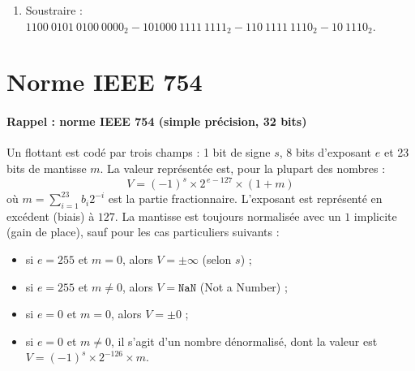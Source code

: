 \documentclass[a4paper,11pt]{article}
\newif\ifsolutions
\begin{document}
\begin{enumerate}
    \item Soustraire : $1100\ 0101\ 0100\ 0000_2 - 101000\ 1111\ 1111_2 - 110\ 1111\ 1110_2 - 10\ 1110_2$.
    \ifsolutions
    \begin{solbox}
    \textit{Piège classique :} Si on ne tient pas compte du format et qu'on complémente ``mal'' (sans aligner les tailles), on obtient un résultat faux. Il faut ramener tous les opérandes à la même taille (ici, 16 bits minimum, mais 17 bits pour être sûr avec des signés).

    Valeurs décimales (pour vérification) : $50496 - 10495 - 1790 - 46 = 38165$.

    En se ramenant à une représentation \textbf{signée sur 17 bits} (pour gérer correctement le bit de signe de l'opérande positif initial de 16 bits) :
    \begin{lstlisting}
       0 1100 0101 0100 0000  (+50496)
     + 1 1101 0111 0000 0001  (-10495 en C2 sur 17 bits)
     + 1 1111 1001 0000 0010  (-1790 en C2 sur 17 bits)
     + 1 1111 1111 1101 0010  (-46 en C2 sur 17 bits)
     -----------------------
     1 0 1001 0101 0001 0101
    \end{lstlisting}
    La retenue de 18ème bit est ignorée. Le résultat sur 17 bits est $0\ 1001\ 0101\ 0001\ 0101_2$, qui vaut bien $\mathbf{38165_{10}}$.

    \textbf{Règle générale :} Pour additionner/soustraire des nombres signés, il faut les coder sur $n$ bits, où :
    $$ n = 1 + \max \Big( \lfloor \log_2(|x_1|) \rfloor + 1,\ \dots,\ \lfloor \log_2(|x_m|) \rfloor + 1 \Big) $$
    Ici, $n = 1 + \max(16, 14, 11, 6) = 17$ bits.
    \end{solbox}
    \fi
\end{enumerate}

\section{Norme IEEE 754}
\paragraph{Rappel : norme IEEE 754 (simple précision, 32 bits)}
Un flottant est codé par trois champs : 1 bit de signe $s$, 8 bits d'exposant $e$ et 23 bits de mantisse $m$.
La valeur représentée est, pour la plupart des nombres :
\[
V = (-1)^s \times 2^{\,e-127} \times (1 + m)
\]
où $m = \sum_{i=1}^{23} b_i 2^{-i}$ est la partie fractionnaire. L'exposant est représenté en excédent (biais) à $127$. La mantisse est toujours normalisée avec un $1$ implicite (gain de place), sauf pour les cas particuliers suivants :
\begin{itemize}
    \item si $e=255$ et $m=0$, alors $V = \pm\infty$ (selon $s$) ;
    \item si $e=255$ et $m \neq 0$, alors $V = \mathtt{NaN}$ (Not a Number) ;
    \item si $e=0$ et $m=0$, alors $V = \pm 0$ ;
    \item si $e=0$ et $m \neq 0$, il s'agit d'un nombre dénormalisé, dont la valeur est $V = (-1)^s \times 2^{-126} \times m$.
\end{itemize}
\end{document}
